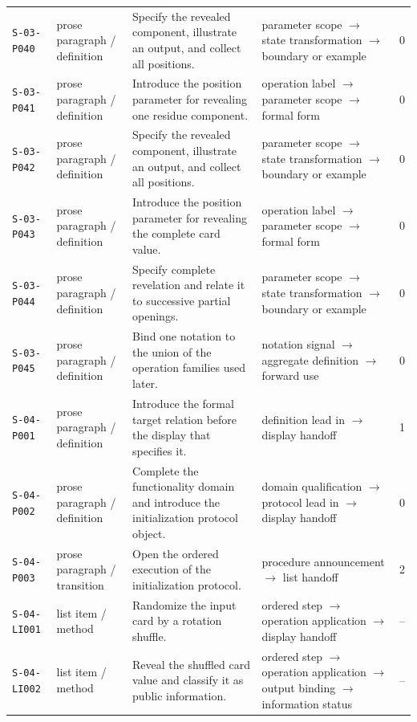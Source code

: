 \documentclass[10pt]{article}
\begin{document}
\begin{longtable}{@{}p{}p{}p{}p{}p{}@{}}
\texttt{S-03-P040}&prose paragraph / definition&Specify the revealed component, illustrate an output, and collect all positions.&parameter scope $\rightarrow$ state transformation $\rightarrow$ boundary or example&0\\
\texttt{S-03-P041}&prose paragraph / definition&Introduce the position parameter for revealing one residue component.&operation label $\rightarrow$ parameter scope $\rightarrow$ formal form&0\\
\texttt{S-03-P042}&prose paragraph / definition&Specify the revealed component, illustrate an output, and collect all positions.&parameter scope $\rightarrow$ state transformation $\rightarrow$ boundary or example&0\\
\texttt{S-03-P043}&prose paragraph / definition&Introduce the position parameter for revealing the complete card value.&operation label $\rightarrow$ parameter scope $\rightarrow$ formal form&0\\
\texttt{S-03-P044}&prose paragraph / definition&Specify complete revelation and relate it to successive partial openings.&parameter scope $\rightarrow$ state transformation $\rightarrow$ boundary or example&0\\
\texttt{S-03-P045}&prose paragraph / definition&Bind one notation to the union of the operation families used later.&notation signal $\rightarrow$ aggregate definition $\rightarrow$ forward use&0\\
\texttt{S-04-P001}&prose paragraph / definition&Introduce the formal target relation before the display that specifies it.&definition lead in $\rightarrow$ display handoff&1\\
\texttt{S-04-P002}&prose paragraph / definition&Complete the functionality domain and introduce the initialization protocol object.&domain qualification $\rightarrow$ protocol lead in $\rightarrow$ display handoff&0\\
\texttt{S-04-P003}&prose paragraph / transition&Open the ordered execution of the initialization protocol.&procedure announcement $\rightarrow$ list handoff&2\\
\texttt{S-04-LI001}&list item / method&Randomize the input card by a rotation shuffle.&ordered step $\rightarrow$ operation application $\rightarrow$ display handoff&--\\
\texttt{S-04-LI002}&list item / method&Reveal the shuffled card value and classify it as public information.&ordered step $\rightarrow$ operation application $\rightarrow$ output binding $\rightarrow$ information status&--\\

\end{longtable}
\end{document}
